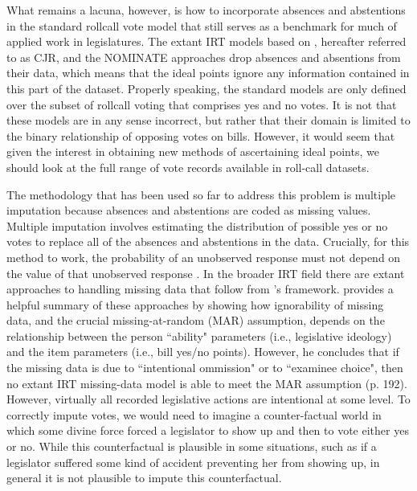 	What remains a lacuna, however, is how to incorporate absences and abstentions in the standard rollcall vote model that still serves as a benchmark for much of applied work in legislatures. The extant IRT models based on \textcite{jackman2004}, hereafter referred to as CJR, and the NOMINATE approaches \parencite{poole2008} drop absences and absentions from their data, which means that the ideal points ignore any information contained in this part of the dataset. Properly speaking, the standard models are only defined over the subset of rollcall voting that comprises yes and no votes. It is not that these models are in any sense incorrect, but rather that their domain is limited to the binary relationship of opposing votes on bills. However, it would seem that given the interest in obtaining new methods of ascertaining ideal points, we should look at the full range of vote records available in roll-call datasets.
	
	
The methodology that has been used so far to address this problem is multiple imputation because absences and abstentions are coded as missing values. Multiple imputation involves estimating the distribution of possible yes or no votes to replace all of the absences and abstentions in the data. Crucially, for this method to work, the probability of an unobserved response must not depend on the value of that unobserved response \parencite{rubin2002}. 	In the broader IRT field there are extant approaches to handling missing data that follow from \textcite{rubin2002}'s framework. \textcite{mislevy2016} provides a helpful summary of these approaches by showing how ignorability of missing data, and the crucial missing-at-random (MAR) assumption, depends on the relationship between the person ``ability" parameters (i.e., legislative ideology) and the item parameters (i.e., bill yes/no points). However, he concludes that if the missing data is due to ``intentional ommission" or to ``examinee choice", then no extant IRT missing-data model is able to meet the MAR assumption (p. 192). However, virtually all recorded legislative actions are intentional at some level. To correctly impute votes, we would need to imagine a counter-factual world in which some divine force forced a legislator to show up and then to vote either yes or no. While this counterfactual is plausible in some situations, such as if a legislator suffered some kind of accident preventing her from showing up, in general it is not plausible to impute this counterfactual.

